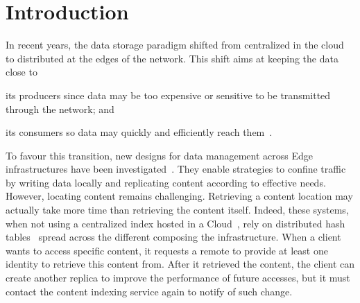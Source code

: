 
\section{Introduction}


In recent years, the data storage paradigm shifted from centralized in
the cloud to distributed at the edges of the network. 
This shift aims at keeping the data close to
\begin{inparaenum}[(i)]
\item its producers since data may be too expensive or sensitive to be
  transmitted through the network; and
\item its consumers so data may quickly and efficiently reach
  them~\cite{cachier, foggy_cache, shi2016edge}.
\end{inparaenum}
%
To favour this transition, new designs for data management across Edge
infrastructures have been investigated~\cite{confais2017object,
  confais2017performance, fogstore, hasenburg2020towards}.  They
enable strategies to confine traffic by writing data locally and
replicating content according to effective needs. However, locating
content remains challenging. Retrieving a content location may
actually take more time than retrieving the content itself.
%
Indeed, these systems, when not using a centralized index hosted in a
Cloud~\REF, rely on distributed hash
tables~\cite{maymounkov2002kademlia} spread across the different
\processes composing the infrastructure. When a client wants to access
specific content, it requests a remote \process to provide at least
one \process identity to retrieve this content from. After it
retrieved the content, the client can create another replica to
improve the performance of future accesses, but it must contact the
content indexing service again to notify of such change.
%

